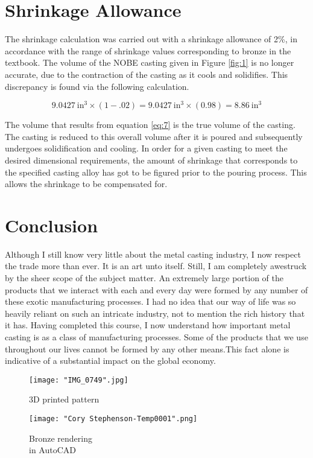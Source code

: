 \documentclass{article}
\begin{document}
 
 
\section{Shrinkage Allowance}

The shrinkage calculation was carried out with a shrinkage allowance of 2\%, in accordance with the range of shrinkage values corresponding to bronze in the textbook. The volume of the NOBE casting given in Figure \ref{fig:1} is no longer accurate, due to the contraction of the casting as it cools and solidifies. This discrepancy is found via the following calculation.

\begin{equation}
9.0427\ \mathrm{in^3} \times (1 - .02) = 9.0427\ \mathrm{in^3} \times (0.98) = 8.86\ \mathrm{in^3} \label{eq:7}
\end{equation}

The volume that results from equation \eqref{eq:7} is the true volume of the casting. The casting is reduced to this overall volume after it is poured and subsequently undergoes solidification and cooling. In order for a given casting to meet the desired dimensional requirements, the amount of shrinkage that corresponds to the specified casting alloy has got to be figured prior to the pouring process. This allows the shrinkage to be compensated for.

\newpage



\section{Conclusion}

Although I still know very little about the metal casting industry, I now respect the trade more than ever. It is an art unto itself. Still, I am completely awestruck by the sheer scope of the subject matter. An extremely large portion of the products that we interact with each and every day were formed by any number of these exotic manufacturing processes. I had no idea that our way of life was so heavily reliant on such an intricate industry, not to mention the rich history that it has. Having completed this course, I now understand how important metal casting is as a class of manufacturing processes. Some of the products that we use throughout our lives cannot be formed by any other means.This fact alone is indicative of a substantial impact on the global economy.  

\begin{figure}[H]
\captionsetup{format =hang}
  \begin{minipage}[b]{0.4\textwidth}
    \texttt{[image: "IMG\_0749".jpg]}
    \caption{3D printed pattern}
    \label{fig:1}
  \end{minipage}
  \hfill
  \begin{minipage}[b]{0.4\textwidth}
    \texttt{[image: "Cory Stephenson-Temp0001".png]}
    \caption{Bronze rendering\\ in AutoCAD}
    \label{fig:2}
  \end{minipage}
\end{figure}
\end{document}

